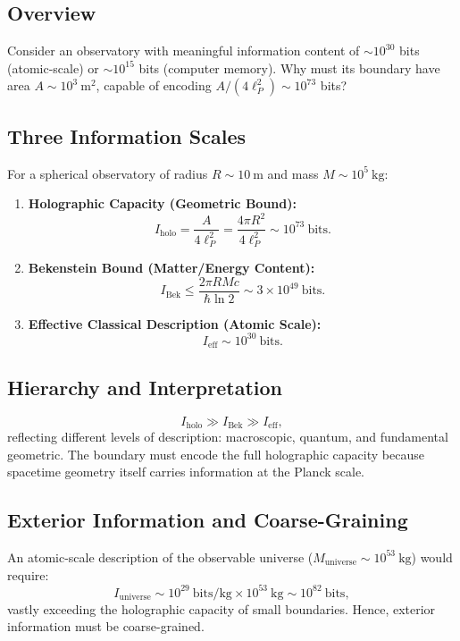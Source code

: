 ﻿\documentclass[12pt]{article}
\begin{document}
\subsection{Overview}


Consider an observatory with meaningful information content of $\sim 10^{30}$ bits (atomic-scale) or $\sim 10^{15}$ bits (computer memory). Why must its boundary have area $A \sim 10^3~\mathrm{m^2}$, capable of encoding $A/(4\ell_P^2) \sim 10^{73}$ bits?


\subsection{Three Information Scales}


For a spherical observatory of radius $R \sim 10~\mathrm{m}$ and mass $M \sim 10^5~\mathrm{kg}$:


\begin{enumerate}
    \item \textbf{Holographic Capacity (Geometric Bound):}
    \[
    I_{\mathrm{holo}} = \frac{A}{4\ell_P^2} = \frac{4 \pi R^2}{4 \ell_P^2} \sim 10^{73}~\text{bits}.
    \]


    \item \textbf{Bekenstein Bound (Matter/Energy Content):}
    \[
    I_{\mathrm{Bek}} \le \frac{2\pi R M c}{\hbar \ln 2} \sim 3 \times 10^{49}~\text{bits}.
    \]


    \item \textbf{Effective Classical Description (Atomic Scale):}
    \[
    I_{\mathrm{eff}} \sim 10^{30}~\text{bits}.
    \]
\end{enumerate}


\subsection{Hierarchy and Interpretation}


\[
I_{\mathrm{holo}} \gg I_{\mathrm{Bek}} \gg I_{\mathrm{eff}},
\]
reflecting different levels of description: macroscopic, quantum, and fundamental geometric. The boundary must encode the full holographic capacity because spacetime geometry itself carries information at the Planck scale.


\subsection{Exterior Information and Coarse-Graining}


An atomic-scale description of the observable universe ($M_{\mathrm{universe}} \sim 10^{53}~\mathrm{kg}$) would require:
\[
I_{\mathrm{universe}} \sim 10^{29}~\text{bits/kg} \times 10^{53}~\mathrm{kg} \sim 10^{82}~\text{bits},
\]
vastly exceeding the holographic capacity of small boundaries. Hence, exterior information must be coarse-grained.
\end{document}

